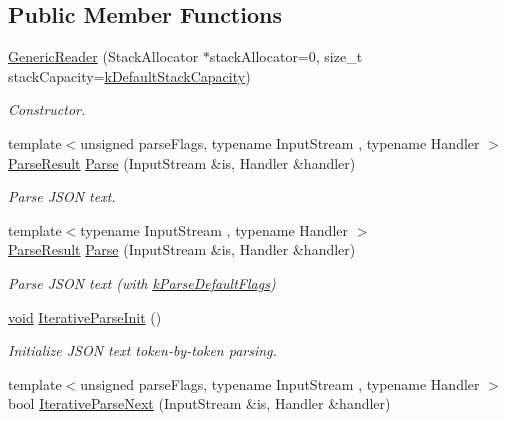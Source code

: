 \subsection*{Public Member Functions}
\begin{DoxyCompactItemize}
\item 
\hyperlink{classGenericReader_aab875a34b3092df9fb4e2b8eac6dbb96}{Generic\+Reader} (Stack\+Allocator $\ast$stack\+Allocator=0, size\+\_\+t stack\+Capacity=\hyperlink{classGenericReader_ac507ea8672bf2b5d01b35583c0597f15}{k\+Default\+Stack\+Capacity})
\begin{DoxyCompactList}\small\item\em Constructor. \end{DoxyCompactList}\item 
{\footnotesize template$<$unsigned parse\+Flags, typename Input\+Stream , typename Handler $>$ }\\\hyperlink{structParseResult}{Parse\+Result} \hyperlink{classGenericReader_a0c450620d14ff1824e58bb7bd9b42099}{Parse} (Input\+Stream \&is, Handler \&handler)
\begin{DoxyCompactList}\small\item\em Parse J\+S\+ON text. \end{DoxyCompactList}\item 
{\footnotesize template$<$typename Input\+Stream , typename Handler $>$ }\\\hyperlink{structParseResult}{Parse\+Result} \hyperlink{classGenericReader_a76d91e5fd8dfe48aea7dd6d8a51dd6dc}{Parse} (Input\+Stream \&is, Handler \&handler)
\begin{DoxyCompactList}\small\item\em Parse J\+S\+ON text (with \hyperlink{reader_8h_ab7be7dabe6ffcba60fad441505583450a9104b0946d648e9467cb7a967401ec80}{k\+Parse\+Default\+Flags}) \end{DoxyCompactList}\item 
\hyperlink{imgui__impl__opengl3__loader_8h_ac668e7cffd9e2e9cfee428b9b2f34fa7}{void} \hyperlink{classGenericReader_a7de472eda2ad9de13cfd8c1de74f1754}{Iterative\+Parse\+Init} ()
\begin{DoxyCompactList}\small\item\em Initialize J\+S\+ON text token-\/by-\/token parsing. \end{DoxyCompactList}\item 
{\footnotesize template$<$unsigned parse\+Flags, typename Input\+Stream , typename Handler $>$ }\\bool \hyperlink{classGenericReader_a257891331e0c259903e7066fb4cebf92}{Iterative\+Parse\+Next} (Input\+Stream \&is, Handler \&handler)

\end{DoxyCompactItemize}
